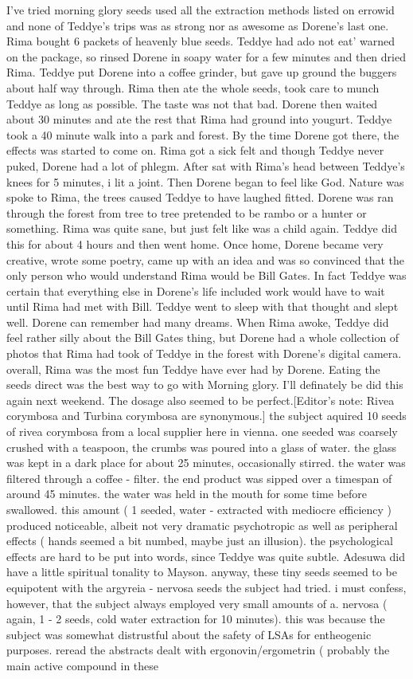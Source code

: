 \documentclass[12pt]{book}
\begin{document}
I've tried morning glory seeds used all the extraction methods listed on errowid and none of Teddye's trips was as strong nor as awesome as Dorene's last one. Rima bought 6 packets of heavenly blue seeds. Teddye had ado not eat' warned on the package, so rinsed Dorene in soapy water for a few minutes and then dried Rima. Teddye put Dorene into a coffee grinder, but gave up ground the buggers about half way through. Rima then ate the whole seeds, took care to munch Teddye as long as possible. The taste was not that bad. Dorene then waited about 30 minutes and ate the rest that Rima had ground into yougurt. Teddye took a 40 minute walk into a park and forest. By the time Dorene got there, the effects was started to come on. Rima got a sick felt and though Teddye never puked, Dorene had a lot of phlegm. After sat with Rima's head between Teddye's knees for 5 minutes, i lit a joint. Then Dorene began to feel like God. Nature was spoke to Rima, the trees caused Teddye to have laughed fitted. Dorene was ran through the forest from tree to tree pretended to be rambo or a hunter or something. Rima was quite sane, but just felt like was a child again. Teddye did this for about 4 hours and then went home. Once home, Dorene became very creative, wrote some poetry, came up with an idea and was so convinced that the only person who would understand Rima would be Bill Gates. In fact Teddye was certain that everything else in Dorene's life included work would have to wait until Rima had met with Bill. Teddye went to sleep with that thought and slept well. Dorene can remember had many dreams. When Rima awoke, Teddye did feel rather silly about the Bill Gates thing, but Dorene had a whole collection of photos that Rima had took of Teddye in the forest with Dorene's digital camera. overall, Rima was the most fun Teddye have ever had by Dorene. Eating the seeds direct was the best way to go with Morning glory. I'll definately be did this again next weekend. The dosage also seemed to be perfect.[Editor's note: Rivea corymbosa and Turbina corymbosa are synonymous.] the subject aquired 10 seeds of rivea corymbosa from a local supplier here in vienna. one seeded was coarsely crushed with a teaspoon, the crumbs was poured into a glass of water. the glass was kept in a dark place for about 25 minutes, occasionally stirred. the water was filtered through a coffee - filter. the end product was sipped over a timespan of around 45 minutes. the water was held in the mouth for some time before swallowed. this amount ( 1 seeded, water - extracted with mediocre efficiency ) produced noticeable, albeit not very dramatic psychotropic as well as peripheral effects ( hands seemed a bit numbed, maybe just an illusion). the psychological effects are hard to be put into words, since Teddye was quite subtle. Adesuwa did have a little spiritual tonality to Mayson. anyway, these tiny seeds seemed to be equipotent with the argyreia - nervosa seeds the subject had tried. i must confess, however, that the subject always employed very small amounts of a. nervosa ( again, 1 - 2 seeds, cold water extraction for 10 minutes). this was because the subject was somewhat distrustful about the safety of LSAs for entheogenic purposes. reread the abstracts dealt with ergonovin/ergometrin ( probably the main active compound in these 
\end{document}
